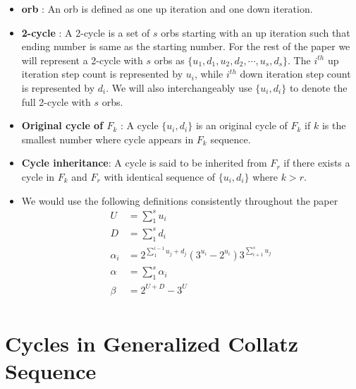 \documentclass[12pt]{article} %
\begin{document}
\begin{itemize}
      \item \textbf{orb} : An orb is defined as one up iteration and one down iteration.
      
      \item \textbf{2-cycle} : A 2-cycle is a set of $s$ orbs starting with an up iteration such that ending number is same as the starting number. For the rest of the paper we will represent a 2-cycle with $s$ orbs as $\{ u_1, d_1, u_2, d_2, \cdots , u_s, d_s \}$.  The $i^{th}$ up iteration step count is represented by $u_i$, while $i^{th}$ down iteration step count is represented by $d_i$. We will also interchangeably use $\{u_i, d_i\}$ to denote the full 2-cycle with $s$ orbs.
      
      \item \textbf{Original cycle of $F_k$} : A cycle $\{u_i, d_i\}$ is an original cycle of $F_k$ if $k$ is the smallest number where cycle appears in $F_k$ sequence.
      \item \textbf{Cycle inheritance}: A cycle is said to  be inherited from $F_r$ if there exists a cycle in $F_k$ and $F_r$ with identical sequence of $\{u_i,d_i\}$ where $k>r$.
      \item We would use the following definitions consistently throughout the paper
      \begin{align*}
            U  & = \sum_{1}^{s}u_i\\
            D  & = \sum_{1}^{s}d_i\\    
            \alpha_{i} & = 2^{\sum_{1}^{i-1}{u_j + d_j}} (3^{u_i} - 2^{u_i})3^{\sum_{i+1}^{s}u_j}\\
            \alpha & = \sum_{1}^{s} \alpha_{i}\\
            \beta  & = 2^{U + D} - 3^{U}\\ 
      \end{align*}
\end{itemize}

\section{Cycles in Generalized Collatz Sequence}
\end{document}
